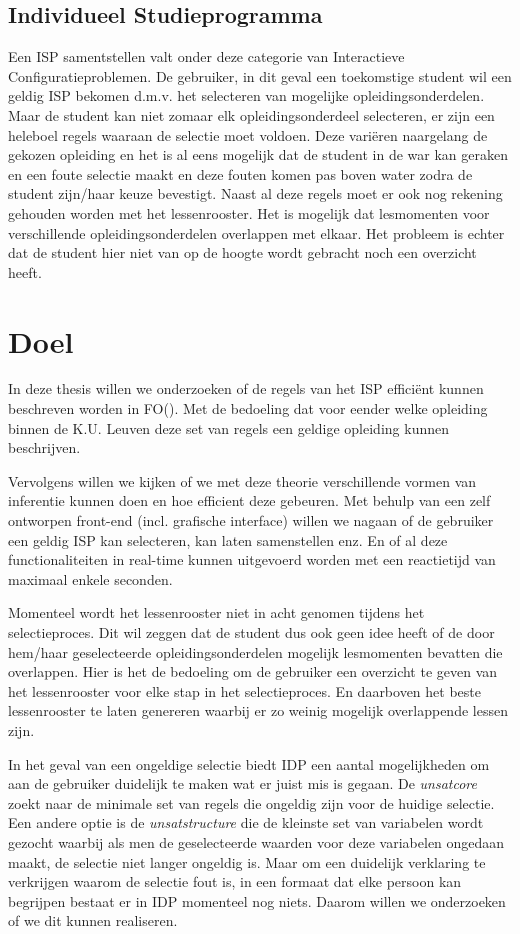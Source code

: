 \subsection{Individueel Studieprogramma}
Een ISP samentstellen valt onder deze categorie van Interactieve Configuratieproblemen. De gebruiker, in dit geval een toekomstige student wil een geldig ISP bekomen d.m.v. het selecteren van mogelijke opleidingsonderdelen. Maar de student kan niet zomaar elk opleidingsonderdeel selecteren, er zijn een heleboel regels waaraan de selectie moet voldoen. Deze vari\"{e}ren naargelang de gekozen opleiding en het is al eens mogelijk dat de student in de war kan geraken en een foute selectie maakt en deze fouten komen pas boven water zodra de student zijn/haar keuze bevestigt. Naast al deze regels moet er ook nog rekening gehouden worden met het lessenrooster. Het is mogelijk dat lesmomenten voor verschillende opleidingsonderdelen overlappen met elkaar. Het probleem is echter dat de student hier niet van op de hoogte wordt gebracht noch een overzicht heeft. 

\section{Doel}
In deze thesis willen we onderzoeken of de regels van het ISP effici\"{e}nt kunnen beschreven worden in FO(\textperiodcentered). Met de bedoeling dat voor eender welke opleiding binnen de K.U. Leuven deze set van regels een geldige opleiding kunnen beschrijven. 

Vervolgens willen we kijken of we met deze theorie verschillende vormen van inferentie kunnen doen en hoe efficient deze gebeuren. Met behulp van een zelf ontworpen front-end (incl. grafische interface) willen we nagaan of de gebruiker een geldig ISP kan selecteren, kan laten samenstellen enz. En of al deze functionaliteiten in real-time kunnen uitgevoerd worden met een reactietijd van maximaal enkele seconden. 

Momenteel wordt het lessenrooster niet in acht genomen tijdens het selectieproces. Dit wil zeggen dat de student dus ook geen idee heeft of de door hem/haar geselecteerde opleidingsonderdelen mogelijk lesmomenten bevatten die overlappen. Hier is het de bedoeling om de gebruiker een overzicht te geven van het lessenrooster voor elke stap in het selectieproces. En daarboven het beste lessenrooster te laten genereren waarbij er zo weinig mogelijk overlappende lessen zijn.

In het geval van een ongeldige selectie biedt IDP een aantal mogelijkheden om aan de gebruiker duidelijk te maken wat er juist mis is gegaan. De \emph{unsatcore} zoekt naar de minimale set van regels die ongeldig zijn voor de huidige selectie. Een andere optie is de \emph{unsatstructure} die de kleinste set van variabelen wordt gezocht waarbij als men de geselecteerde waarden voor deze variabelen ongedaan maakt, de selectie niet langer ongeldig is. Maar om een duidelijk verklaring te verkrijgen waarom de selectie fout is, in een formaat dat elke persoon kan begrijpen bestaat er in IDP momenteel nog niets. Daarom willen we onderzoeken of we dit kunnen realiseren.

